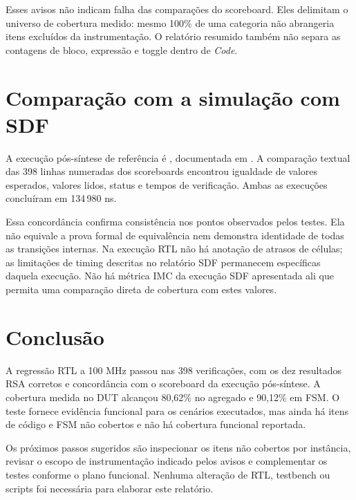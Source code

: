 \documentclass[11pt,a4paper]{article}
\begin{document}
Esses avisos não indicam falha das comparações do scoreboard. Eles delimitam
o universo de cobertura medido: mesmo 100\% de uma categoria não abrangeria
itens excluídos da instrumentação. O relatório resumido também não separa
as contagens de bloco, expressão e toggle dentro de \emph{Code}.

\section{Comparação com a simulação com SDF}
A execução pós-síntese de referência é
,
documentada em .
A comparação textual das 398 linhas numeradas dos scoreboards encontrou
igualdade de valores esperados, valores lidos, status e tempos de verificação.
Ambas as execuções concluíram em 134\,980 ns.

Essa concordância confirma consistência nos pontos observados pelos testes.
Ela não equivale a prova formal de equivalência nem demonstra identidade
de todas as transições internas. Na execução RTL não há anotação de atrasos
de células; as limitações de timing descritas no relatório SDF permanecem
específicas daquela execução. Não há métrica IMC da execução SDF apresentada
ali que permita uma comparação direta de cobertura com estes valores.

\section{Conclusão}
A regressão RTL a 100 MHz passou nas 398 verificações, com os dez resultados
RSA corretos e concordância com o scoreboard da execução pós-síntese.
A cobertura medida no DUT alcançou 80,62\% no agregado e 90,12\% em FSM.
O teste fornece evidência funcional para os cenários executados, mas ainda
há itens de código e FSM não cobertos e não há cobertura funcional reportada.

Os próximos passos sugeridos são inspecionar os itens não cobertos por
instância, revisar o escopo de instrumentação indicado pelos avisos e
complementar os testes conforme o plano funcional. Nenhuma alteração de
RTL, testbench ou scripts foi necessária para elaborar este relatório.

\appendix
\end{document}
